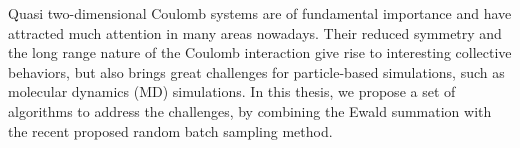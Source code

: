 Quasi two-dimensional Coulomb systems are of fundamental importance and have attracted much attention in many areas nowadays.
Their reduced symmetry and the long range nature of the Coulomb interaction give rise to interesting collective behaviors, but also brings great challenges for particle-based simulations, such as molecular dynamics (MD) simulations.
In this thesis, we propose a set of algorithms to address the challenges, by combining the Ewald summation with the recent proposed random batch sampling method.